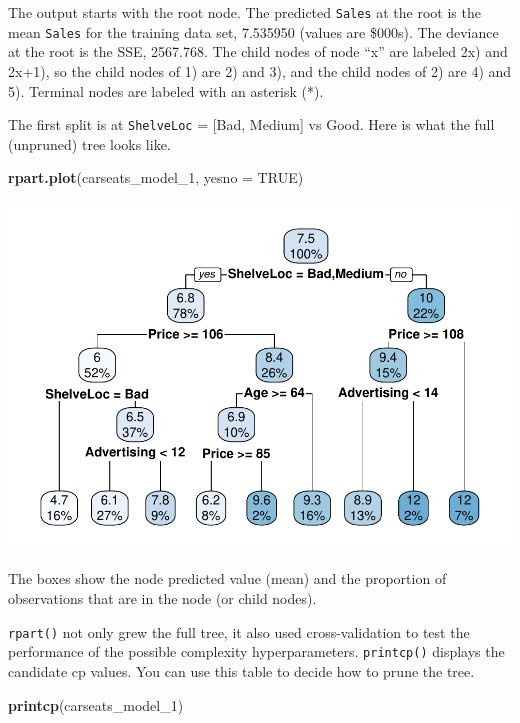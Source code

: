 \documentclass[
]{book}
\newenvironment{Shaded}{\begin{snugshade}}{\end{snugshade}}
\newcommand{\DataTypeTok}[1]{\textcolor[rgb]{0.13,0.29,0.53}{#1}}
\newcommand{\DecValTok}[1]{\textcolor[rgb]{0.00,0.00,0.81}{#1}}
\newcommand{\KeywordTok}[1]{\textcolor[rgb]{0.13,0.29,0.53}{\textbf{#1}}}
\newcommand{\NormalTok}[1]{#1}
\newcommand{\OtherTok}[1]{\textcolor[rgb]{0.56,0.35,0.01}{#1}}
\begin{document}
The output starts with the root node. The predicted \texttt{Sales} at the root is the mean \texttt{Sales} for the training data set, 7.535950 (values are \$000s). The deviance at the root is the SSE, 2567.768. The child nodes of node ``x'' are labeled 2x) and 2x+1), so the child nodes of 1) are 2) and 3), and the child nodes of 2) are 4) and 5). Terminal nodes are labeled with an asterisk (*).

The first split is at \texttt{ShelveLoc} = {[}Bad, Medium{]} vs Good. Here is what the full (unpruned) tree looks like.

\begin{Shaded}
\begin{Highlighting}[]
\KeywordTok{rpart.plot}\NormalTok{(carseats_model_}\DecValTok{1}\NormalTok{, }\DataTypeTok{yesno =} \OtherTok{TRUE}\NormalTok{)}
\end{Highlighting}
\end{Shaded}

\includegraphics{data-sci_files/figure-latex/unnamed-chunk-65-1.pdf}

The boxes show the node predicted value (mean) and the proportion of observations that are in the node (or child nodes).

\texttt{rpart()} not only grew the full tree, it also used cross-validation to test the performance of the possible complexity hyperparameters. \texttt{printcp()} displays the candidate cp values. You can use this table to decide how to prune the tree.

\begin{Shaded}
\begin{Highlighting}[]
\KeywordTok{printcp}\NormalTok{(carseats_model_}\DecValTok{1}\NormalTok{)}
\end{Highlighting}
\end{Shaded}
\end{document}
